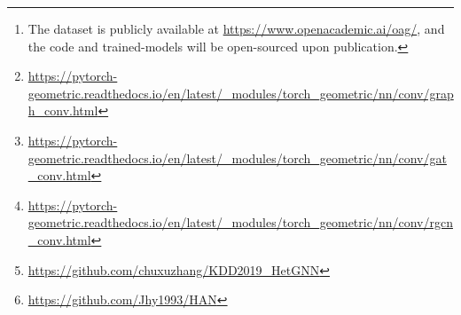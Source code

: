 \begin{abstract}
{We compare HGT with some state-of-art graph neural networks. All these baselines as well as our own model\footnote{The dataset is publicly available at \url{https://www.openacademic.ai/oag/}, and the code and trained-models will be open-sourced upon publication.} are implemented via PyTorch Geometric (PyG) package~\cite{pyG}, a GNN framework that supports fast training via graph gather/scatter operation. The first class of GNNs are designed for homogeneous graphs, including:
\begin{itemize}
    \item Graph Convolutional Networks (GCN)~\cite{gcn}, which simply average the neighbor's embedding followed by linear projection. We use the implementation provided in PyG~\footnote{\url{https://pytorch-geometric.readthedocs.io/en/latest/_modules/torch_geometric/nn/conv/graph_conv.html}}.
    \item Graph Attention Networks (GAT)~\cite{gat}, which adopts multi-head additive attention on neighbors. We use the implementation provided in PyG~\footnote{\url{https://pytorch-geometric.readthedocs.io/en/latest/_modules/torch_geometric/nn/conv/gat_conv.html}}. 
\end{itemize}
We also compared with GNNs that dedicatedly designed for heterogeneous graphs, including:
\begin{itemize}
    \item Relational Graph Convolutional Networks (RGCN)~\cite{DBLP:conf/esws/SchlichtkrullKB18}, which keeps a different weight for each relationship, i.e., a relation triplet. We use the implementation provided in PyG~\footnote{\url{https://pytorch-geometric.readthedocs.io/en/latest/_modules/torch_geometric/nn/conv/rgcn_conv.html}}.
    \item Heterogeneous Graph Neural Networks (HetGNN)~\cite{DBLP:conf/kdd/ZhangSHSC19}, which adopts different Bi-LSTMs for different node type for aggregating neighbor information. We re-implement this model in PyG following the authors' official code~\footnote{\url{https://github.com/chuxuzhang/KDD2019_HetGNN}}.
    \item Heterogeneous Graph Attention Networks (HAN)~\cite{DBLP:conf/www/WangJSWYCY19}, which adopts two layers of attentions to aggregate neighbor information via different meta paths. We re-implement this model in PyG following the authors' official code~\footnote{\url{https://github.com/Jhy1993/HAN}}.
\end{itemize}

To further examine whether the components in our model can indeed exploit heterogeneity and temporal dependency, and eventually benefit downstream performance, we also propose two baselines as ablation study:  HGT$_{\text{noHeter}}$, which uses a same set of weight for all meta relation, and HGT$_{\text{noTime}}$, which removes the relative temporal encoding component. 

}
\end{abstract}
